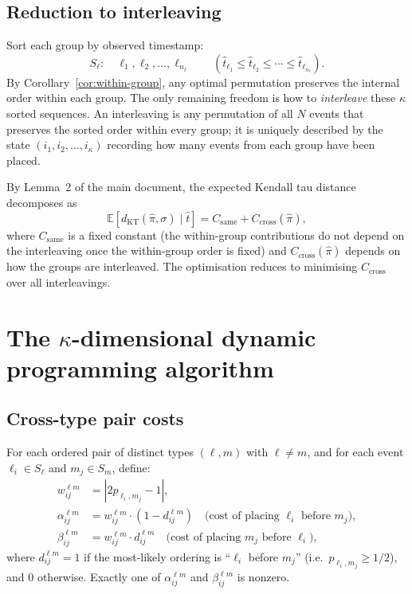\documentclass[11pt]{article}
\begin{document}
\subsection{Reduction to interleaving}

Sort each group by observed timestamp:
\[
  S_\ell:\quad \ell_1, \ell_2, \ldots, \ell_{n_\ell}
  \qquad (\hat{t}_{\ell_1} \le \hat{t}_{\ell_2} \le \cdots \le \hat{t}_{\ell_{n_\ell}}).
\]
By Corollary~\ref{cor:within-group}, any optimal permutation preserves the internal
order within each group.  The only remaining freedom is how to \emph{interleave}
these $\kappa$ sorted sequences.  An interleaving is any permutation of all $N$
events that preserves the sorted order within every group; it is uniquely described by
the state $(i_1, i_2, \ldots, i_\kappa)$ recording how many events from each group
have been placed.

By Lemma~2 of the main document, the expected Kendall tau distance decomposes as
\[
  \mathbb{E}[d_{\mathrm{KT}}(\hat{\pi},\sigma)\mid\hat{t}]
  = C_{\mathrm{same}} + C_{\mathrm{cross}}(\hat{\pi}),
\]
where $C_{\mathrm{same}}$ is a fixed constant (the within-group contributions do not
depend on the interleaving once the within-group order is fixed) and
$C_{\mathrm{cross}}(\hat{\pi})$ depends on how the groups are interleaved.  The
optimisation reduces to minimising $C_{\mathrm{cross}}$ over all interleavings.

\section{The $\kappa$-dimensional dynamic programming algorithm}

\subsection{Cross-type pair costs}

For each ordered pair of distinct types $(\ell, m)$ with $\ell \ne m$, and for each
event $\ell_i \in S_\ell$ and $m_j \in S_m$, define:
\begin{align}
  w_{ij}^{\ell m} &= |2p_{\ell_i, m_j} - 1|, \\
  \alpha_{ij}^{\ell m} &= w_{ij}^{\ell m} \cdot (1 - d_{ij}^{\ell m})
    \quad \text{(cost of placing $\ell_i$ before $m_j$)}, \\
  \beta_{ij}^{\ell m} &= w_{ij}^{\ell m} \cdot d_{ij}^{\ell m}
    \quad \text{(cost of placing $m_j$ before $\ell_i$)},
\end{align}
where $d_{ij}^{\ell m} = 1$ if the most-likely ordering is ``$\ell_i$ before $m_j$''
(i.e.\ $p_{\ell_i, m_j} \ge 1/2$), and $0$ otherwise.  Exactly one of
$\alpha_{ij}^{\ell m}$ and $\beta_{ij}^{\ell m}$ is nonzero.
\end{document}
